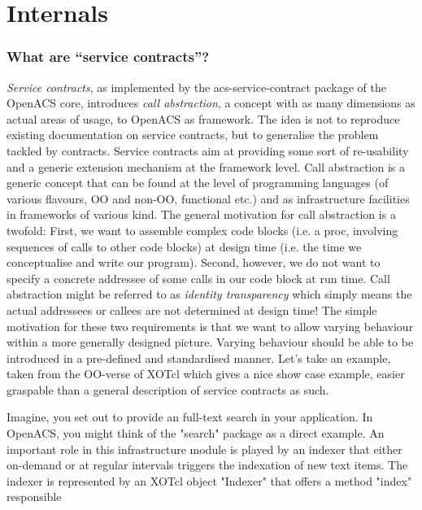 \section{Internals}\label{sec:internal}
\subsubsection{What are ``service contracts''?}\label{sec:internal:contracts}
\emph{Service contracts}, as implemented by the acs-service-contract
package of the OpenACS core, introduces \emph{call abstraction}, a
concept with as many dimensions as actual areas of usage, to OpenACS
as framework. The idea is not to reproduce existing documentation on
service contracts, but to generalise the problem tackled by
contracts. Service contracts aim at providing some sort of
re-usability and a generic extension mechanism at the framework
level. Call abstraction is a generic concept that can be found at the
level of programming languages (of various flavours, OO and non-OO,
functional etc.) and as infrastructure facilities in frameworks of
various kind. The general motivation for call abstraction is a
twofold: First, we want to assemble complex code blocks (i.e. a proc,
involving sequences of calls to other code blocks) at design time
(i.e. the time we conceptualise and write our program). Second,
however, we do not want to specify a concrete addressee of some calls
in our code block at run time. Call abstraction might be referred to
as \emph{identity transparency} which simply means the actual
addressees or callees are not determined at design time! The simple
motivation for these two requirements is that we want to allow varying
behaviour within a more generally designed picture. Varying behaviour
should be able to be introduced in a pre-defined and standardised
manner. Let's take an example, taken from the OO-verse of XOTcl which
gives a nice show case example, easier graspable than a general
description of service contracts as such.
%
\lstset{breaklines=true,numbers=left,basicstyle=\footnotesize,frame=single}

%
Imagine, you set out to provide an full-text search in your
application. In OpenACS, you might think of the "search" package as a
direct example. An important role in this infrastructure module is
played by an indexer that either on-demand or at regular intervals
triggers the indexation of new text items. The indexer is represented
by an XOTcl object "Indexer" that offers a method "index" responsible
